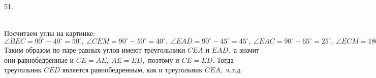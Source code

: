 51. \begin{figure}[ht!]
\end{figure}\\
Посчитаем углы на картинке: $\angle BEC=90^\circ-40^\circ=50^\circ,\ \angle CEM=90^\circ-50^\circ=40^\circ,\ \angle EAD=90^\circ-45^\circ=45^\circ,\ \angle EAC=90^\circ-65^\circ=25^\circ,\ \angle ECM=180^\circ-90^\circ-40^\circ-25^\circ=25^\circ.$ Таким образом по паре равных углов имеют треугольники $CEA$ и $EAD,$ а значит они равнобедренные и $CE=AE,\ AE=ED,$ поэтому и $CE=ED.$ Тогда треугольник $CED$ является равнобедренным, как и треугольник $CEA,$ ч.т.д.\\

